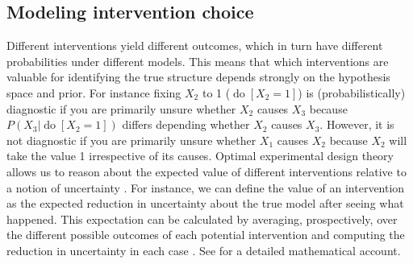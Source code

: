 \documentclass{cambridge7A}%
\DeclareMathOperator*{\Do}{do}
\newcommand{\ww}{\mathbf{w}} %
\newcommand{\cali}{\mathcal{A}} %
\newcommand{\E}{\mathbb{E}} %
\newcommand{\cm}{a} %
\newcommand{\dm}{d} %
\newcommand{\ca}{\mathbf{a}} %
\newcommand{\da}{\mathbf{d}} %
\begin{document}
\subsection{Modeling intervention choice}

Different interventions yield different outcomes, which in turn have different probabilities under different models.  This means that which interventions are valuable for identifying the true structure depends strongly on the hypothesis space and prior.  For instance fixing $X_2$ to 1 ($\Do[X_2\!=\!1]$) is (probabilistically) diagnostic if you are primarily unsure whether $X_2$ causes $X_3$ because $P(X_3|\Do[X_2\!=\!1])$ differs depending whether $X_2$ causes $X_3$.  However, it is not diagnostic if you are primarily unsure whether $X_1$ causes $X_2$ because $X_2$ will take the value 1 irrespective of its causes.  Optimal experimental design theory allows us to reason about the expected value of different interventions relative to a notion of uncertainty \citep{fedorov1972theory,raiffa1974applied}.  For instance, we can define the value of an intervention as the expected reduction in uncertainty about the true model after seeing what happened. This expectation can be calculated by averaging, prospectively, over the different possible outcomes of each potential intervention %
and computing the
reduction in uncertainty in each case \citep[e.g.,][]{shannon1951prediction}. See \cite{bramley2017neurath} for a detailed mathematical account.%
\end{document}
